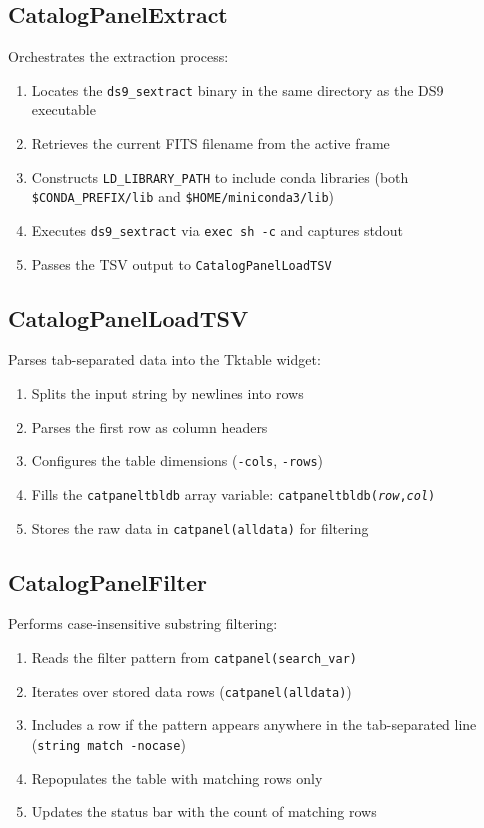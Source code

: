 \documentclass[11pt,fleqn]{book}
\newcommand{\sextract}{\texttt{ds9\_sextract}}
\begin{document}
\subsection{CatalogPanelExtract}

Orchestrates the extraction process:

\begin{enumerate}[leftmargin=2em]
  \item Locates the \sextract{} binary in the same directory as the DS9 executable
  \item Retrieves the current FITS filename from the active frame
  \item Constructs \texttt{LD\_LIBRARY\_PATH} to include conda libraries (both \texttt{\$CONDA\_PREFIX/lib} and \texttt{\$HOME/miniconda3/lib})
  \item Executes \sextract{} via \texttt{exec sh -c} and captures stdout
  \item Passes the TSV output to \texttt{CatalogPanelLoadTSV}
\end{enumerate}

\subsection{CatalogPanelLoadTSV}

Parses tab-separated data into the Tktable widget:

\begin{enumerate}[leftmargin=2em]
  \item Splits the input string by newlines into rows
  \item Parses the first row as column headers
  \item Configures the table dimensions (\texttt{-cols}, \texttt{-rows})
  \item Fills the \texttt{catpaneltbldb} array variable: \texttt{catpaneltbldb(\textit{row},\textit{col})}
  \item Stores the raw data in \texttt{catpanel(alldata)} for filtering
\end{enumerate}

\subsection{CatalogPanelFilter}

Performs case-insensitive substring filtering:

\begin{enumerate}[leftmargin=2em]
  \item Reads the filter pattern from \texttt{catpanel(search\_var)}
  \item Iterates over stored data rows (\texttt{catpanel(alldata)})
  \item Includes a row if the pattern appears anywhere in the tab-separated line (\texttt{string match -nocase})
  \item Repopulates the table with matching rows only
  \item Updates the status bar with the count of matching rows
\end{enumerate}
\end{document}
